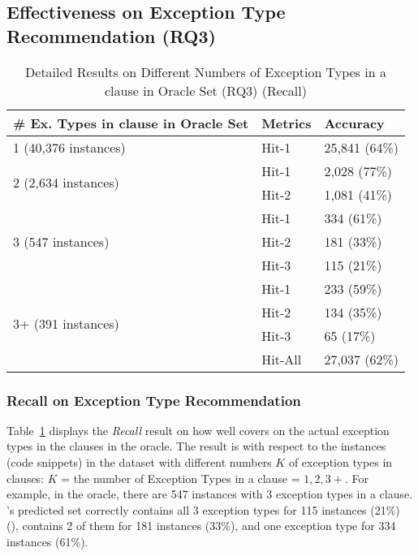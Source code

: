 \subsection{Effectiveness on Exception Type Recommendation (RQ3)}
\label{sec:rq3}

\begin{table}[t]
  \caption{Detailed Results on Different Numbers of Exception Types in a
     clause in Oracle Set (RQ3) (Recall)}
	{\small
		\begin{center}
			\renewcommand{\arraystretch}{1}
			\begin{tabular}{p{4.5cm}<{\centering}|p{1cm}<{\centering}|p{1.5cm}<{\centering}}
				\hline
				\# Ex. Types in \code{catch} clause in Oracle Set & Metrics &  Accuracy\\
				\hline
				\multirow{1}{*}{1 (40,376 instances)}   & Hit-1  & 25,841 (64\%) \\
				\hline
				\multirow{2}{*}{2 (2,634 instances)}  & Hit-1   & 2,028 (77\%) \\
				& Hit-2         &  1,081 (41\%) \\
				\hline
				\multirow{3}{*}{3 (547 instances)}  & Hit-1    & 334 (61\%) \\
				& Hit-2     & 181 (33\%)\\
				& Hit-3     & 115 (21\%) \\
				\hline
				\multirow{4}{*}{3+ (391 instances)}  & Hit-1   & 233 (59\%) \\
				& Hit-2     & 134 (35\%) \\
				& Hit-3     & 65 (17\%)\\
                                \hline
                                & Hit-All & 27,037 (62\%)\\
				\hline
			\end{tabular}		
			\label{tab:recall-3}
		\end{center}
	}
\end{table}

\subsubsection{{\bf Recall on Exception Type Recommendation}}
\label{sec:req3-recall}

Table~\ref{tab:recall-3} displays the {\em Recall} result on how well
{\tool} covers on the actual exception types in the 
clauses in the oracle. The result is with respect to the instances
(code snippets) in the dataset with different numbers $K$ of exception
types in  clauses: $K$ = the number of Exception Types in
a  clause = $1,2,3+$. For example, in the oracle, there
are 547 instances with 3 exception types in a 
clause. {\tool}'s predicted set correctly contains all 3 exception
types for 115 instances (21\%) (), contains 2 of them
for 181 instances (33\%), and one exception type for 334 instances
(61\%).

